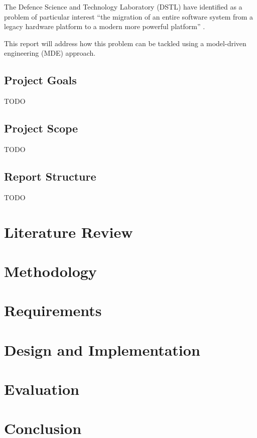 \documentclass{UoYCSproject}
\begin{document}

The Defence Science and Technology Laboratory (DSTL) have identified as a problem of particular interest ``the migration of an entire software system from a legacy hardware platform to a modern more powerful platform'' \parencite{gerasimou2017technical}. 


This report will address how this problem can be tackled using a model-driven engineering (MDE) approach.

\section{Project Goals}
TODO
\section{Project Scope}
TODO
\section{Report Structure}
TODO

\chapter{Literature Review}

\chapter{Methodology}

\chapter{Requirements}

\chapter{Design and Implementation}

\chapter{Evaluation}

\chapter{Conclusion}

\printbibliography
\end{document}
